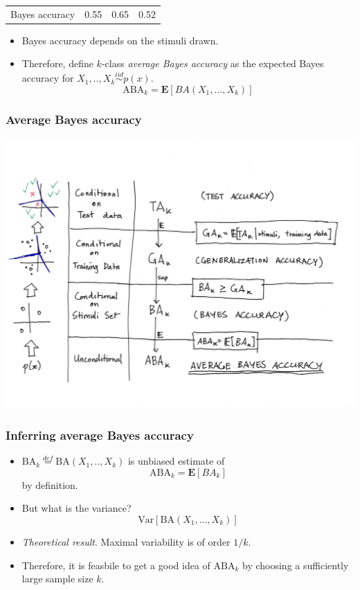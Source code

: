 \documentclass{beamer}
\newcommand{\E}{\textbf{E}}
\begin{document}
\begin{frame}
\begin{center}
\begin{tabular}{c|c|c|c}
Bayes accuracy & 0.55 & 0.65 & 0.52 \\
\end{tabular}
\end{center}
\begin{itemize}
\item Bayes accuracy depends on the stimuli drawn. \pause
\item Therefore, define $k$-class \emph{average Bayes accuracy} as the expected Bayes accuracy for $X_1,..,X_k \stackrel{iid}{\sim} p(x)$.
\[
\text{ABA}_k = \E[BA(X_1,...,X_k)]
\]
\end{itemize}
\end{frame}

\begin{frame}
\frametitle{Average Bayes accuracy}
\includegraphics[scale = 0.45, clip = true, trim = 0in 1in 0.5in 1in]{ta_to_aba.png}
\end{frame}

\begin{frame}
\frametitle{Inferring average Bayes accuracy}

\begin{itemize}
\item $\text{BA}_k \stackrel{def}{=} \text{BA}(X_1,..,X_k)$ is unbiased estimate of
\[
\text{ABA}_k = \E[BA_k]
\]
by definition. \pause
\item But what is the variance?
\[
\text{Var}[\text{BA}(X_1,...,X_k)]
\]
\pause
\item \emph{Theoretical result}. Maximal variability is of order $1/k$. \pause
\item Therefore, it is feasbile to get a good idea of $\text{ABA}_k$ by choosing a sufficiently large sample size $k$.
\end{itemize}
\end{frame}
\end{document}
